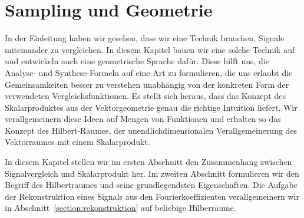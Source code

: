%
%
%
\chapter{Sampling und Geometrie
\label{chapter:geometrie}}
In der Einleitung haben wir gesehen, dass wir eine Technik brauchen,
Signale miteinander zu vergleichen.
In diesem Kapitel bauen wir eine solche Technik auf und entwickeln
auch eine geometrische Sprache dafür.
Diese hilft uns, die Analyse- und Synthese-Formeln auf eine Art zu formulieren,
die uns erlaubt die Gemeinsamkeiten besser zu verstehen unabhängig von
der konkreten Form der verwendeten Vergleichsfunktionen.
Es stellt sich heraus, dass das Konzept des Skalarproduktes aus der
Vektorgeometrie genau die richtige Intuition liefert.
Wir verallgemeinern diese Ideen auf Mengen von Funktionen
und erhalten so das Konzept des Hilbert-Raumes, der unendlichdimensionalen 
Verallgemeinerung des Vektorraumes mit einem Skalarprodukt.

In diesem Kapitel stellen wir im ersten Abschnitt den Zusammenhang
zwischen Signalvergleich und Skalarprodukt her.
Im zweiten Abschnitt formulieren wir den Begriff des Hilbertraumes
und seine grundlegendsten Eigenschaften.
Die Aufgabe der Rekonstruktion eines Signals aus den Fourierkoeffizienten
verallgemeinern wir in Abschnitt~\ref{section:rekonstruktion} auf beliebige
Hilberräume.






